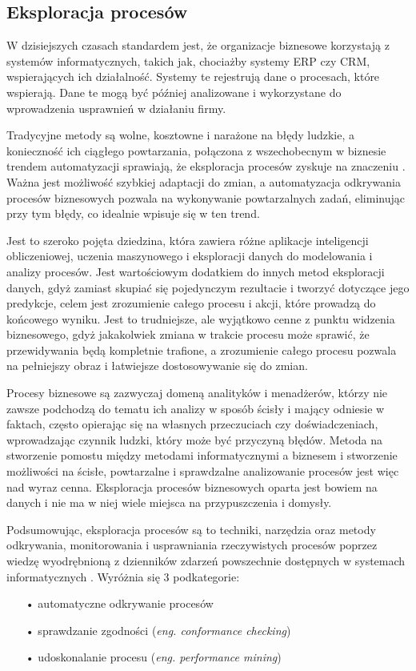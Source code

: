 \subsection{Eksploracja procesów}

W dzisiejszych czasach standardem jest, że organizacje biznesowe korzystają z systemów informatycznych, takich jak, chociażby systemy ERP czy CRM, wspierających ich działalność. Systemy te rejestrują dane o procesach, które wspierają. Dane te mogą być później analizowane i wykorzystane do wprowadzenia usprawnień w działaniu firmy.   

Tradycyjne metody są wolne, kosztowne i narażone na błędy ludzkie, a konieczność ich ciągłego powtarzania, połączona z wszechobecnym w biznesie trendem automatyzacji sprawiają, że eksploracja procesów zyskuje na znaczeniu \cite{market-pm}. Ważna jest możliwość szybkiej adaptacji do zmian, a automatyzacja odkrywania procesów biznesowych pozwala na wykonywanie powtarzalnych zadań, eliminując przy tym błędy, co idealnie wpisuje się w ten trend.

Jest to szeroko pojęta dziedzina, która zawiera różne aplikacje inteligencji obliczeniowej, uczenia maszynowego i eksploracji danych do modelowania i analizy procesów. 
Jest wartościowym dodatkiem do innych metod eksploracji danych, gdyż zamiast skupiać się pojedynczym rezultacie i tworzyć dotyczące jego predykcje, celem jest zrozumienie całego procesu i akcji, które prowadzą do końcowego wyniku. Jest to trudniejsze, ale wyjątkowo cenne z punktu widzenia biznesowego, gdyż jakakolwiek zmiana w trakcie procesu może sprawić, że przewidywania będą kompletnie trafione, a zrozumienie całego procesu pozwala na pełniejszy obraz i łatwiejsze dostosowywanie się do zmian. 

Procesy biznesowe są zazwyczaj domeną analityków i menadżerów, którzy nie zawsze podchodzą do tematu ich analizy w sposób ścisły i mający odniesie w faktach, często opierając się na własnych przeczuciach czy doświadczeniach, wprowadzając czynnik ludzki, który może być przyczyną błędów. Metoda na stworzenie pomostu między metodami informatycznymi a biznesem i stworzenie możliwości na ścisłe, powtarzalne i sprawdzalne analizowanie procesów jest więc nad wyraz cenna. Eksploracja procesów biznesowych oparta jest bowiem na danych i nie ma w niej wiele miejsca na przypuszczenia i domysły.

Podsumowując, eksploracja procesów są to techniki, narzędzia oraz metody odkrywania, monitorowania i usprawniania rzeczywistych procesów poprzez wiedzę wyodrębnioną z dzienników zdarzeń powszechnie dostępnych w systemach informatycznych \cite{pm-manifesto}\cite{mining-overview}.
Wyróżnia się 3 podkategorie: 
\begin{itemize}
  \item[•] automatyczne odkrywanie procesów
  \item[•] sprawdzanie zgodności (\textit{eng. conformance checking})
  \item[•] udoskonalanie procesu (\textit{eng. performance mining})
\end{itemize}


